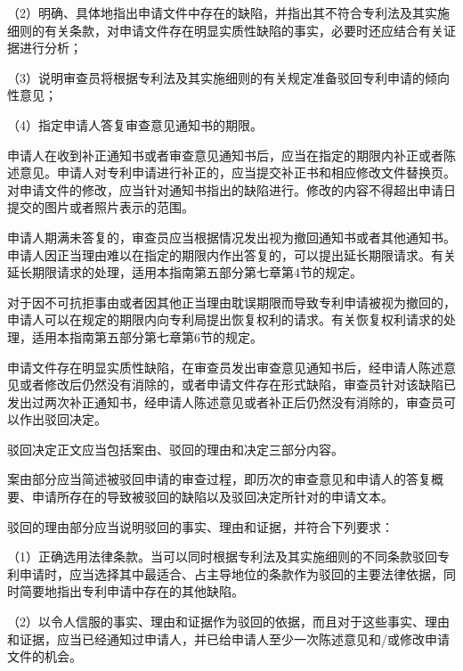 {\setlength{\parindent}{17.1bp}（2）明确、具体地指出申请文件中存在的缺陷，并指出其不符合专利法及其实施细则的有关条款，对申请文件存在明显实质性缺陷的事实，必要时还应结合有关证据进行分析；\par}

{\setlength{\parindent}{17.1bp}（3）说明审查员将根据专利法及其实施细则的有关规定准备驳回专利申请的倾向性意见；\par}

{\setlength{\parindent}{17.1bp}（4）指定申请人答复审查意见通知书的期限。\par}

申请人在收到补正通知书或者审查意见通知书后，应当在指定的期限内补正或者陈述意见。申请人对专利申请进行补正的，应当提交补正书和相应修改文件替换页。对申请文件的修改，应当针对通知书指出的缺陷进行。修改的内容不得超出申请日提交的图片或者照片表示的范围。

申请人期满未答复的，审查员应当根据情况发出视为撤回通知书或者其他通知书。申请人因正当理由难以在指定的期限内作出答复的，可以提出延长期限请求。有关延长期限请求的处理，适用本指南第五部分第七章第4节的规定。

对于因不可抗拒事由或者因其他正当理由耽误期限而导致专利申请被视为撤回的，申请人可以在规定的期限内向专利局提出恢复权利的请求。有关恢复权利请求的处理，适用本指南第五部分第七章第6节的规定。

申请文件存在明显实质性缺陷，在审查员发出审查意见通知书后，经申请人陈述意见或者修改后仍然没有消除的，或者申请文件存在形式缺陷，审查员针对该缺陷已发出过两次补正通知书，经申请人陈述意见或者补正后仍然没有消除的，审查员可以作出驳回决定。

驳回决定正文应当包括案由、驳回的理由和决定三部分内容。

案由部分应当简述被驳回申请的审查过程，即历次的审查意见和申请人的答复概要、申请所存在的导致被驳回的缺陷以及驳回决定所针对的申请文本。

驳回的理由部分应当说明驳回的事实、理由和证据，并符合下列要求：

{\setlength{\parindent}{17.1bp}（1）正确选用法律条款。当可以同时根据专利法及其实施细则的不同条款驳回专利申请时，应当选择其中最适合、占主导地位的条款作为驳回的主要法律依据，同时简要地指出专利申请中存在的其他缺陷。\par}

{\setlength{\parindent}{17.1bp}（2）以令人信服的事实、理由和证据作为驳回的依据，而且对于这些事实、理由和证据，应当已经通知过申请人，并已给申请人至少一次陈述意见和/或修改申请文件的机会。\par}

